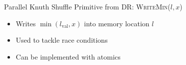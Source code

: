 \begin{frame}{Parallel Knuth Shuffle}
  Primitive from DR: \textsc{WriteMin(\(l, x\))}
  \begin{itemize}
    \item Writes \(\min(l_{\text{val}}, x)\) into memory location \(l\)
    \item Used to tackle race conditions
    \item Can be implemented with atomics
  \end{itemize}
\end{frame}
